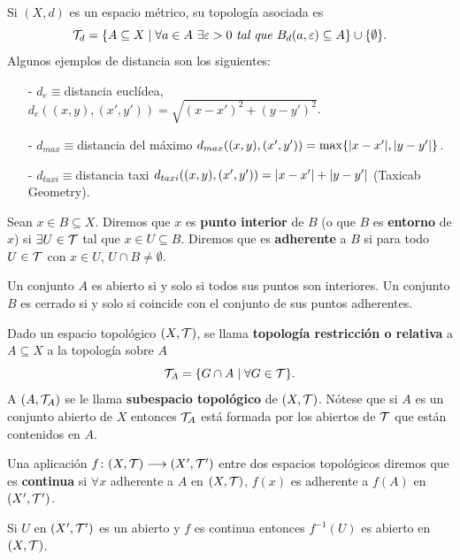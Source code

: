 \documentclass[GTS.tex]{subfiles}
\begin{document}
\begin{ej} Si $(X,d)$ es un espacio métrico, su topología asociada es
\[
\Tau_d=\{A\subseteq X\mid\forall a\in A\ \exists\varepsilon>0\ \textit{tal\ que } B_d(a,\varepsilon)\subseteq A\}\cup\{\emptyset\}.
\]
Algunos ejemplos de distancia son los siguientes:
\begin{enumerate}
\item[-] $d_e\equiv$distancia euclídea, $d_e((x,y),(x',y'))=\sqrt{(x-x')^2+(y-y')^2}$.
\item[-] $d_{max}\equiv$distancia del máximo $d_{max}((x,y),(x',y'))=\max\{\lvert x-x'\rvert,\lvert y-y'\rvert\}$.
\item[-] $d_{taxi}\equiv$distancia taxi $d_{taxi}((x,y),(x',y'))=\lvert x-x'\rvert+\lvert y-y'\rvert$ (Taxicab Geometry).
\end{enumerate}
\end{ej}

\begin{defi}Sean $x\in B\subseteq X$. Diremos que $x$ es \textbf{punto interior} de $B$ (o que $B$ es \textbf{entorno} de $x$) si $\exists U\in\mathcal{T}$ tal que $x\in U\subseteq B$. Diremos que es \textbf{adherente} a $B$ si para todo $U\in\mathcal{T}$ con $x\in U$, $U\cap B\neq\emptyset$.
\end{defi}

\begin{prop} Un conjunto $A$ es abierto si y solo si todos sus puntos son interiores. Un conjunto $B$ es cerrado si y solo si coincide con el conjunto de sus puntos adherentes.
\end{prop}

\begin{defi}
Dado un espacio topológico $(X,\mathcal{T})$, se llama \textbf{topología restricción o relativa } a $A\subseteq X$ a la topología sobre $A$
\[
\mathcal{T}_A=\{G\cap A\mid\forall G\in \mathcal{T}\}.
\]
A $(A,\mathcal{T}_A)$ se le llama \textbf{subespacio topológico} de $(X,\mathcal{T})$. Nótese que si $A$ es un conjunto abierto de $X$ entonces $\mathcal{T}_A$ está formada por los abiertos de $\mathcal{T}$ que están contenidos en $A$.
\end{defi}

\begin{defi}Una aplicación $f\colon{(X,\mathcal{T})}\longrightarrow{(X',\mathcal{T}')}$ entre dos espacios topológicos diremos que es \textbf{continua} si $\forall x$ adherente a $A$ en $(X,\mathcal{T})$, $f(x)$ es adherente a $f(A)$ en $(X',\mathcal{T}')$.
\end{defi}
\begin{prop}Si $U$ en $(X',\mathcal{T}')$ es un abierto y $f$ es continua entonces $f^{-1}(U)$ es abierto en $(X,\mathcal{T})$.
\end{prop}
\end{document}
